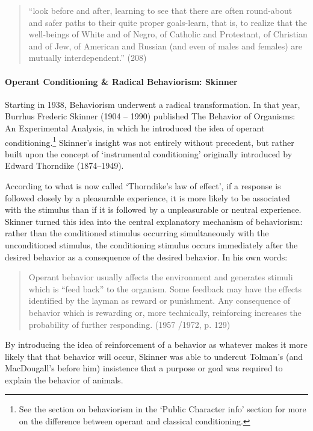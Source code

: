 \begin{quote}

“look before and after, learning to see that there are often round-about and safer paths to their quite proper goals-learn, that is, to realize that the well-beings of White and of Negro, of Catholic and Protestant, of Christian and of Jew, of American and Russian (and even of males and females) are mutually interdependent.” (208) 
\end{quote}

\paragraph{Operant Conditioning \& Radical Behaviorism: Skinner}
\label{operantconditioningradicalbehaviorism:skinner}

Starting in 1938, Behaviorism underwent a radical transformation. In that year, Burrhus Frederic Skinner (1904 – 1990) published The Behavior of Organisms: An Experimental Analysis, in which he introduced the idea of operant conditioning.\footnote{See the section on behaviorism in the `Public Character info' section for more on the difference between operant and classical conditioning.} Skinner's insight was not entirely without precedent, but rather built upon the concept of `instrumental conditioning' originally introduced by Edward Thorndike (1874--1949). 

According to what is now called `Thorndike's law of effect', if a response is followed closely by a pleasurable experience, it is more likely to be associated with the stimulus than if it is followed by a unpleasurable or neutral experience. Skinner turned this idea into the central explanatory mechanism of behaviorism: rather than the conditioned stimulus occurring simultaneously with the unconditioned stimulus, the conditioning stimulus occurs immediately after the desired behavior as a consequence of the desired behavior. In his own words:

\begin{quote}

Operant behavior usually affects the environment and generates stimuli which is “feed back” to the organism. Some feedback may have the effects identified by the layman as reward or punishment. Any consequence of behavior which is rewarding or, more technically, reinforcing increases the probability of further responding. (1957 \slash  1972, p. 129)
\end{quote}

By introducing the idea of reinforcement of a behavior as whatever makes it more likely that that behavior will occur, Skinner was able to undercut Tolman's (and MacDougall's before him) insistence that a purpose or goal was required to explain the behavior of animals.


